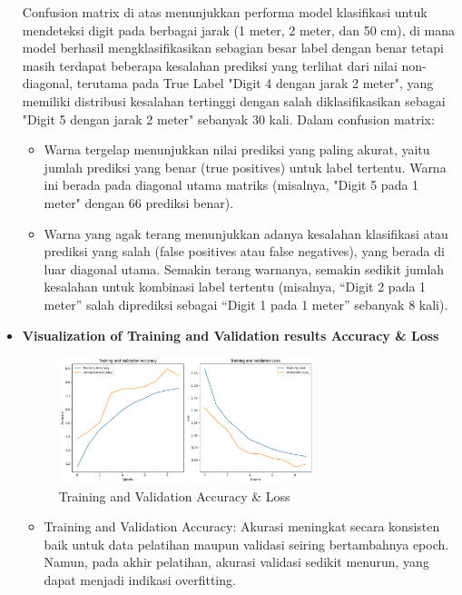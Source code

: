\documentclass[12pt,a4paper]{article}
\begin{document}
\begin{itemize}
\hspace{0.5cm} Confusion matrix di atas menunjukkan performa model klasifikasi untuk mendeteksi digit pada berbagai jarak (1 meter, 2 meter, dan 50 cm), di mana model berhasil mengklasifikasikan sebagian besar label dengan benar tetapi masih terdapat beberapa kesalahan prediksi yang terlihat dari nilai non-diagonal, terutama pada True Label "Digit 4 dengan jarak 2 meter", yang memiliki distribusi kesalahan tertinggi dengan salah diklasifikasikan sebagai "Digit 5 dengan jarak 2 meter" sebanyak 30 kali.
Dalam confusion matrix:

\begin{itemize}
    \begin{itemize}
        \item Warna tergelap menunjukkan nilai prediksi yang paling akurat, yaitu jumlah prediksi yang benar (true positives) untuk label tertentu. Warna ini berada pada diagonal utama matriks (misalnya, "Digit 5 pada 1 meter" dengan 66 prediksi benar).

        \item Warna yang agak terang menunjukkan adanya kesalahan klasifikasi atau prediksi yang salah (false positives atau false negatives), yang berada di luar diagonal utama. Semakin terang warnanya, semakin sedikit jumlah kesalahan untuk kombinasi label tertentu (misalnya, “Digit 2 pada 1 meter” salah diprediksi sebagai “Digit 1 pada 1 meter” sebanyak 8 kali).
    \end{itemize}
\end{itemize}

\newpage
    \item \textbf {Visualization of Training and Validation results Accuracy & Loss}
\begin{figure}[h]
    \centering
    \includegraphics[width=0.7\textwidth]{Image/Grafik Train.png}
    \caption{Training and Validation Accuracy \& Loss}
    \label{fig:Training_and_Validation_Accuracy_\&_Loss}
\end{figure}

\begin{itemize}
    \begin{itemize}
        \item Training and Validation Accuracy: Akurasi meningkat secara konsisten baik untuk data pelatihan maupun validasi seiring bertambahnya epoch. Namun, pada akhir pelatihan, akurasi validasi sedikit menurun, yang dapat menjadi indikasi overfitting.


\end{itemize}
\end{itemize}
\end{itemize}
\end{document}
